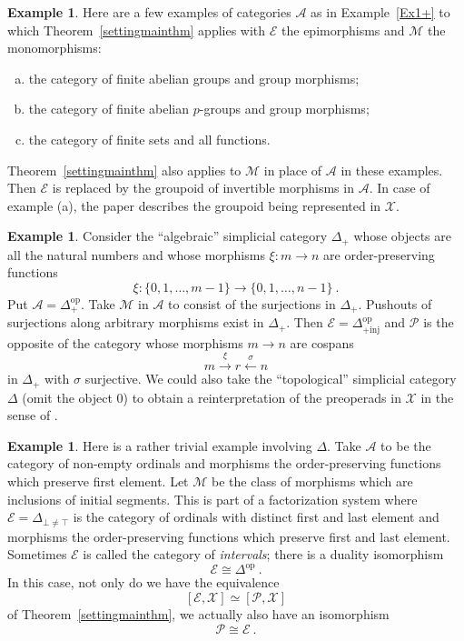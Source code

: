 \documentclass[a4paper,12pt,reqno]{amsart}
\theoremstyle{definition}
\newtheorem{example}[theorem]{Example}
\theoremstyle{fact}
\theoremstyle{genquest}
\theoremstyle{step}
\newcommand{\lra}{\longrightarrow}
\newcommand{\lla}{\longleftarrow}
\def\CA{{\mathscr A}}
\def\CE{{\mathscr E}}
\def\CM{{\mathscr M}}
\def\CP{{\mathscr P}}
\def\CX{{\mathscr X}}
\begin{document}
\begin{example}
Here are a few examples of categories $\CA$ as in Example~\ref{Ex1+} to which 
Theorem~\ref{settingmainthm} applies with $\CE$ 
the epimorphisms and $\CM$ the monomorphisms:
\begin{enumerate}[(a)]
\item the category of finite abelian groups and group morphisms;
\item the category of finite abelian $p$-groups and group morphisms;
\item the category of finite sets and all functions.
\end{enumerate}
Theorem~\ref{settingmainthm} also applies to $\CM$ in place of $\CA$
in these examples. Then $\CE$ is replaced by the groupoid of
invertible morphisms in $\CA$. In case of example (a),
the paper \cite{HillarDarren2007} describes the groupoid being represented in $\CX$. 
\end{example}

\begin{example}
Consider the ``algebraic'' simplicial category $\Delta_+$ 
whose objects are all the natural numbers and 
whose morphisms $\xi : m\lra n$ are order-preserving functions 
$$\xi : \{0, 1, \dots , m-1\}\lra \{0, 1, \dots , n-1\} \ .$$
Put $\CA = \Delta_+^{\mathrm{op}}$.
Take $\CM$ in $\CA$ to consist of the surjections in $\Delta_+$.
Pushouts of surjections along arbitrary morphisms exist in 
$\Delta_+$. 
Then $\CE = \Delta_{+\mathrm{inj}}^{\mathrm{op}}$
and $\CP$ is the opposite of the category whose morphisms
$m\lra n$ are cospans $$m\stackrel{\xi}\lra r \stackrel{\sigma}\lla n$$
in $\Delta_+$ with $\sigma$ surjective. 
We could also take the ``topological'' simplicial category 
$\Delta$ (omit the object $0$) to obtain
a reinterpretation of the preoperads in $\CX$ in the sense of 
\cite{Berger1996}.
\end{example}

\begin{example}
Here is a rather trivial example involving $\Delta$.
Take $\CA$ to be the category of non-empty ordinals and morphisms
the order-preserving functions which preserve first element.
Let $\CM$ be the class of morphisms which are inclusions of
initial segments. This is part of a factorization system where
$\CE = \Delta_{\bot \neq \top}$ is the category of ordinals with 
distinct first and last element 
and morphisms the order-preserving functions which preserve first 
and last element. Sometimes $\CE$ is called the category of {\em intervals}; there is a duality isomorphism
$$\CE \cong \Delta^{\mathrm{op}} \ .$$ 
In this case, not only do we have the equivalence
$$[\CE, \CX] \simeq [\CP, \CX] $$
of Theorem~\ref{settingmainthm}, we actually also have an isomorphism
$$\CP \cong \CE \ .$$
\end{example}
\end{document}

